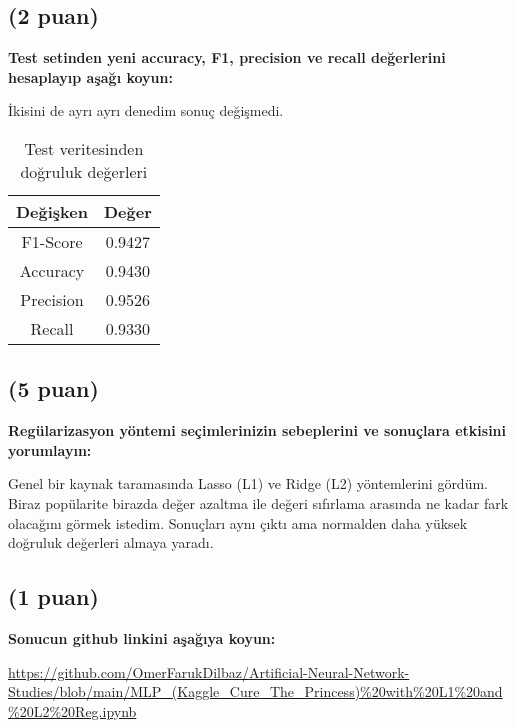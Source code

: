 \documentclass[11pt]{article}
\begin{document}
\subsection{(2 puan)} \textbf{Test setinden yeni accuracy, F1, precision ve recall değerlerini hesaplayıp aşağı koyun:}

İkisini de ayrı ayrı denedim sonuç değişmedi.

\begin{table}[ht!]
    \centering
    \caption{Test veritesinden doğruluk değerleri}
    \begin{tabular}{c|c}
        Değişken & Değer\\\hline
        F1-Score & 0.9427 \\
        Accuracy & 0.9430\\
        Precision & 0.9526\\
        Recall & 0.9330\\
    \end{tabular}

\end{table}


\subsection{(5 puan)} \textbf{Regülarizasyon yöntemi seçimlerinizin sebeplerini ve sonuçlara etkisini yorumlayın:}

Genel bir kaynak taramasında Lasso (L1) ve Ridge (L2) yöntemlerini gördüm. Biraz popülarite birazda değer azaltma ile değeri sıfırlama arasında ne kadar fark olacağını görmek istedim. Sonuçları aynı çıktı ama normalden daha yüksek doğruluk değerleri almaya yaradı.

\subsection{(1 puan)} \textbf{Sonucun github linkini  aşağıya koyun:}

\url{https://github.com/OmerFarukDilbaz/Artificial-Neural-Network-Studies/blob/main/MLP_(Kaggle_Cure_The_Princess)%20with%20L1%20and%20L2%20Reg.ipynb}
\end{document}
